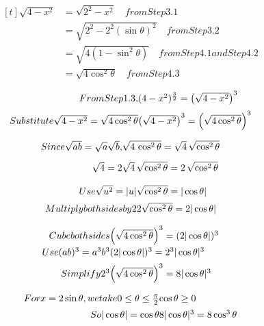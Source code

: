 \documentclass{article}
\begin{document}
\[
\begin{aligned}[t]
 \sqrt{4-x^2}
 &= \sqrt{2^2-x^2}\quad from Step 3.1 \\
 &= \sqrt{2^2-2^2(\sin\theta)^2}\quad from Step 3.2 \\
 &= \sqrt{4(1-\sin^2\theta)}\quad from Step 4.1 and Step 4.2 \\
 &= \sqrt{4\cos^2\theta}\quad from Step 4.3 \end{aligned}
\]

\[
\begin{array}{@{}r@{}l@{}}
 From Step 1.3 , &
 (4-x^2)^{\frac{3}{2}}=\left(\sqrt{4-x^2}\right)^3
 \\[1.5ex]
 Substitute \sqrt{4-x^2}=\sqrt{4\cos^2\theta}
 &
 \left(\sqrt{4-x^2}\right)^3
 =
 \left(\sqrt{4\cos^2\theta}\right)^3
 \end{array}
\]

\[
\begin{array}{@{}r@{}l@{}}
 Since \sqrt{ab}=\sqrt{a}\sqrt{b} , &
 \sqrt{4\,\cos^2\theta}
 =
 \sqrt4\,\sqrt{\cos^2\theta}
 \\[2.0ex]
 \sqrt4=2 &
 \sqrt4\,\sqrt{\cos^2\theta}
 =
 2\,\sqrt{\cos^2\theta}
 \end{array}
\]

\[
\begin{array}{@{}r@{}l@{}}
 Use \sqrt{u^2}=|u|
 &
 \sqrt{\cos^2\theta}=|\cos\theta|
 \\[1.2ex]
 Multiply both sides by 2
 &
 2 \sqrt{\cos^2\theta}
 =
 2 |\cos\theta|
 \end{array}
\]

\[
\begin{array}{@{}r@{}l@{}}
 Cube both sides &
 \left(\sqrt{4\cos^2\theta}\right)^{ 3 }
 =
 (2|\cos\theta|)^{ 3 }
 \\[1.2ex]
 Use (ab)^3=a^3b^3
 &
 (2|\cos\theta|)^3
 =
 2^3 |\cos\theta|^3
 \\[1.2ex]
 Simplify 2^3
 &
 \left(\sqrt{4\cos^2\theta}\right)^3
 =
 8 |\cos\theta|^3
 \end{array}
\]

\[
\begin{array}{@{}r@{}l@{}}
 For x=2\sin\theta , we take 0\le \theta\le \frac{\pi}{2}
 &
 \cos\theta\ge 0
 \\[1.2ex]
 So |\cos\theta|=\cos\theta
 &
 8|\cos\theta|^3=8\cos^3\theta
 \end{array}
\]
\end{document}
